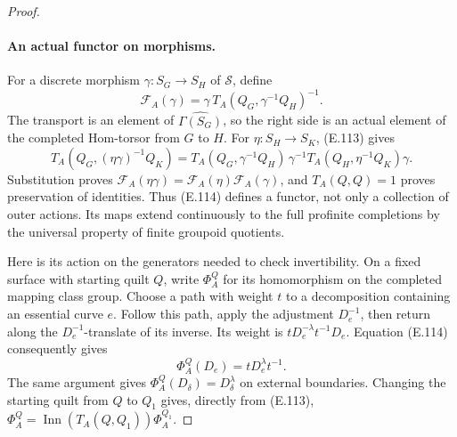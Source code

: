\begin{proof}
\paragraph{An actual functor on morphisms.}
For a discrete morphism
$\gamma:S_G\to S_H$ of $\mathcal S$, define
\[
 \mathcal F_A(\gamma)
   =\gamma\,
     T_A(Q_G,\gamma^{-1}Q_H)^{-1}.                    \tag{E.114}
\]
The transport is an element of
$\widehat{\Gamma(S_G)}$, so the right side
is an actual element of the completed
Hom-torsor from $G$ to $H$.
For $\eta:S_H\to S_K$, (E.113) gives
\[
 T_A(Q_G,(\eta\gamma)^{-1}Q_K)
 =T_A(Q_G,\gamma^{-1}Q_H)\,
   \gamma^{-1}T_A(Q_H,\eta^{-1}Q_K)\gamma .
\]
Substitution proves
$\mathcal F_A(\eta\gamma)
=\mathcal F_A(\eta)\mathcal F_A(\gamma)$,
and $T_A(Q,Q)=1$ proves preservation of
identities.  Thus (E.114) defines a functor,
not only a collection of outer actions.
Its maps extend continuously to the full
profinite completions by the universal
property of finite groupoid quotients.

Here is its action on the generators needed
to check invertibility.  On a fixed surface
with starting quilt $Q$, write
$\Phi_A^Q$ for its homomorphism on the
completed mapping class group.
Choose a path with weight $t$ to a
decomposition containing an essential
curve $e$.  Follow this path, apply the
adjustment $D_e^{-1}$, then return along
the $D_e^{-1}$-translate of its inverse.
Its weight is
$tD_e^{-\lambda}t^{-1}D_e$.
Equation (E.114) consequently gives
\[
          \Phi_A^Q(D_e)=tD_e^\lambda t^{-1}.           \tag{E.115}
\]
The same argument gives
$\Phi_A^Q(D_\delta)=D_\delta^\lambda$
on external boundaries.
Changing the starting quilt from $Q$ to
$Q_1$ gives, directly from (E.113),
$\Phi_A^Q=\operatorname{Inn}(T_A(Q,Q_1))
\Phi_A^{Q_1}$.


\end{proof}
